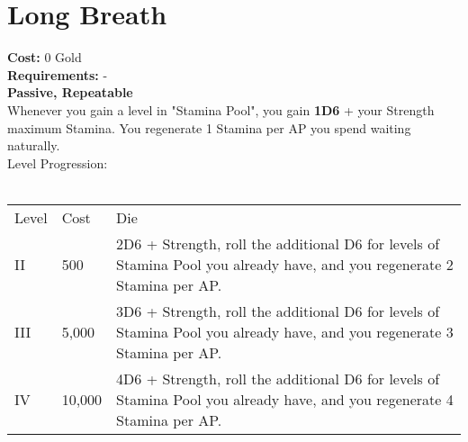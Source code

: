 \section{Long Breath}\label{sec:longbreath}
\textbf{Cost:} 0 Gold\\
\textbf{Requirements:} -\\
\textbf{Passive, Repeatable}\\
Whenever you gain a level in "Stamina Pool", you gain \textbf{1D6} + your Strength maximum Stamina.
You regenerate 1 Stamina per AP you spend waiting naturally.
\\
Level Progression:\\
\\
\begin{tabular}{l | l | p{12cm} }
	Level & Cost & Die\\
	II & 500 & 2D6 + Strength, roll the additional D6 for levels of Stamina Pool you already have, and you regenerate 2 Stamina per AP. \\
	III & 5,000 & 3D6 + Strength, roll the additional D6 for levels of Stamina Pool you already have, and you regenerate 3 Stamina per AP. \\
	IV & 10,000 & 4D6 + Strength, roll the additional D6 for levels of Stamina Pool you already have, and you regenerate 4 Stamina per AP.\\
\end{tabular}